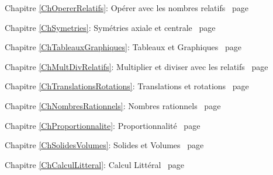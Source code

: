 \documentclass[TS]{sesamanuel}
\begin{document}
\begin{commentaire}

\textcolor{PartieFonction}{\PrerequisTitleFont 
Chapitre \ref{ChOpererRelatifs}: Opérer avec les nombres relatifs \dotfill\ page \pageref{ChOpererRelatifs}}

\vspace{2em}

\textcolor{PartieGeometrie}{\PrerequisTitleFont 
Chapitre \ref{ChSymetries}: Symétries axiale et centrale \dotfill\ page \pageref{ChSymetries}}

\vspace{2em}

\textcolor{PartieFonction}{\PrerequisTitleFont 
Chapitre \ref{ChTableauxGraphiques}: Tableaux et Graphiques \dotfill\ page \pageref{ChTableauxGraphiques}}

\vspace{2em}

\textcolor{PartieFonction}{\PrerequisTitleFont 
Chapitre \ref{ChMultDivRelatifs}: Multiplier et diviser avec les relatifs \dotfill\ page \pageref{ChMultDivRelatifs}}

\vspace{2em}

\textcolor{PartieGeometrie}{\PrerequisTitleFont 
Chapitre \ref{ChTranslationsRotations}: Translations et rotations \dotfill\ page \pageref{ChTranslationsRotations}}

\vspace{2em}

\textcolor{PartieFonction}{\PrerequisTitleFont 
Chapitre \ref{ChNombresRationnels}: Nombres rationnels \dotfill\ page \pageref{ChNombresRationnels}}

\vspace{2em}

\textcolor{PartieFonction}{\PrerequisTitleFont 
Chapitre \ref{ChProportionnalite}: Proportionnalité \dotfill\ page \pageref{ChProportionnalite}}

\vspace{2em}

\textcolor{PartieGeometrie}{\PrerequisTitleFont 
Chapitre \ref{ChSolidesVolumes}: Solides et Volumes \dotfill\ page \pageref{ChSolidesVolumes}}

\vspace{2em}

\textcolor{PartieFonction}{\PrerequisTitleFont 
Chapitre \ref{ChCalculLitteral}: Calcul Littéral \dotfill\ page \pageref{ChCalculLitteral}}

\vspace{2em}

\end{commentaire}
\end{document}
